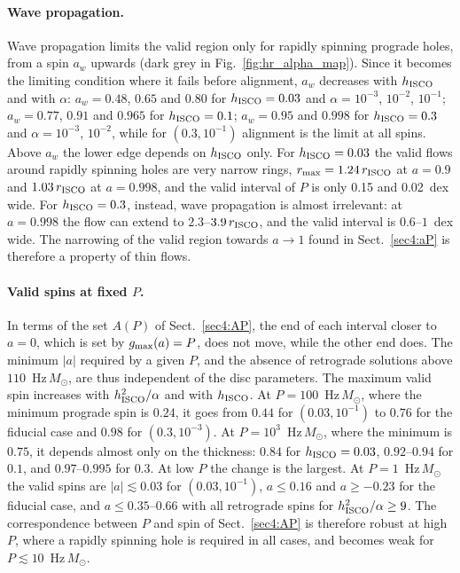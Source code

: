 \paragraph{Wave propagation.}
Wave propagation limits the valid region only for rapidly spinning prograde holes, from a spin $a_w$ upwards (dark grey in Fig.~\ref{fig:hr_alpha_map}).
Since it becomes the limiting condition where it fails before alignment, $a_w$ decreases with $h_\textup{ISCO}$ and with $\alpha$: $a_w=0.48$, $0.65$ and $0.80$ for $h_\textup{ISCO}=0.03$ and $\alpha=10^{-3}$, $10^{-2}$, $10^{-1}$; $a_w=0.77$, $0.91$ and $0.965$ for $h_\textup{ISCO}=0.1$; $a_w=0.95$ and $0.998$ for $h_\textup{ISCO}=0.3$ and $\alpha=10^{-3}$, $10^{-2}$, while for $(0.3,10^{-1})$ alignment is the limit at all spins.
Above $a_w$ the lower edge depends on $h_\textup{ISCO}$ only.
For $h_\textup{ISCO}=0.03$ the valid flows around rapidly spinning holes are very narrow rings, $r_\textup{max}=1.24\,r_\textup{ISCO}$ at $a=0.9$ and $1.03\,r_\textup{ISCO}$ at $a=0.998$, and the valid interval of $P$ is only 0.15 and 0.02~dex wide.
For $h_\textup{ISCO}=0.3$, instead, wave propagation is almost irrelevant: at $a=0.998$ the flow can extend to $2.3$--$3.9\,r_\textup{ISCO}$, and the valid interval is $0.6$--$1$~dex wide.
The narrowing of the valid region towards $a\to1$ found in Sect.~\ref{sec4:aP} is therefore a property of thin flows.

\paragraph{Valid spins at fixed $P$.}
In terms of the set $A(P)$ of Sect.~\ref{sec4:AP}, the end of each interval closer to $a=0$, which is set by $g_\textup{max}(a)=P$, does not move, while the other end does.
The minimum $|a|$ required by a given $P$, and the absence of retrograde solutions above $110$~Hz\,$M_\odot$, are thus independent of the disc parameters.
The maximum valid spin increases with $h_\textup{ISCO}^{2}/\alpha$ and with $h_\textup{ISCO}$.
At $P=100$~Hz\,$M_\odot$, where the minimum prograde spin is $0.24$, it goes from $0.44$ for $(0.03,10^{-1})$ to $0.76$ for the fiducial case and $0.98$ for $(0.3,10^{-3})$.
At $P=10^3$~Hz\,$M_\odot$, where the minimum is $0.75$, it depends almost only on the thickness: $0.84$ for $h_\textup{ISCO}=0.03$, $0.92$--$0.94$ for $0.1$, and $0.97$--$0.995$ for $0.3$.
At low $P$ the change is the largest.
At $P=1$~Hz\,$M_\odot$ the valid spins are $|a|\lesssim0.03$ for $(0.03,10^{-1})$, $a\leq0.16$ and $a\geq-0.23$ for the fiducial case, and $a\leq0.35$--$0.66$ with all retrograde spins for $h_\textup{ISCO}^{2}/\alpha\geq9$.
The correspondence between $P$ and spin of Sect.~\ref{sec4:AP} is therefore robust at high $P$, where a rapidly spinning hole is required in all cases, and becomes weak for $P\lesssim10$~Hz\,$M_\odot$.

